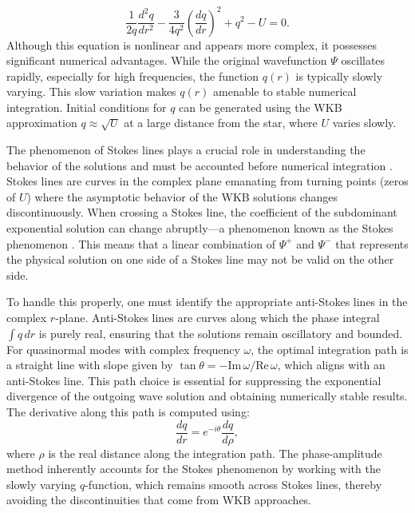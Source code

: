 \begin{equation}
	\frac{1}{2q} \frac{d^2 q}{dr^2} - \frac{3}{4q^2} \left( \frac{dq}{dr} \right)^2 + q^2 - U = 0.
\end{equation}
Although this equation is nonlinear and appears more complex, it possesses significant numerical advantages. While the original wavefunction \(\Psi\) oscillates rapidly, especially for high frequencies, the function \(q(r)\) is typically slowly varying. This slow variation makes \(q(r)\) amenable to stable numerical integration. Initial conditions for \(q\) can be generated using the WKB approximation \(q \approx \sqrt{U}\) at a large distance from the star, where \(U\) varies slowly.

The phenomenon of Stokes lines plays a crucial role in understanding the behavior of the solutions and must be accounted before numerical integration \cite{Anderson_inverse_cowling}. Stokes lines are curves in the complex plane emanating from turning points (zeros of \(U\)) where the asymptotic behavior of the WKB solutions changes discontinuously. When crossing a Stokes line, the coefficient of the subdominant exponential solution can change abruptly—a phenomenon known as the Stokes phenomenon \cite{Anderson_inverse_cowling}. This means that a linear combination of \(\Psi^+\) and \(\Psi^-\) that represents the physical solution on one side of a Stokes line may not be valid on the other side. 

To handle this properly, one must identify the appropriate anti-Stokes lines in the complex \(r\)-plane. Anti-Stokes lines are curves along which the phase integral \(\int q \, dr\) is purely real, ensuring that the solutions remain oscillatory and bounded. For quasinormal modes with complex frequency \(\omega\), the optimal integration path is a straight line with slope given by \(\tan \theta = -\text{Im} \, \omega / \text{Re} \, \omega\), which aligns with an anti-Stokes line. This path choice is essential for suppressing the exponential divergence of the outgoing wave solution and obtaining numerically stable results. The derivative along this path is computed using:
\begin{equation}
	\frac{dq}{dr} = e^{-i\theta} \frac{dq}{d\rho},
\end{equation}
where \(\rho\) is the real distance along the integration path. The phase-amplitude method inherently accounts for the Stokes phenomenon by working with the slowly varying \(q\)-function, which remains smooth across Stokes lines, thereby avoiding the discontinuities that come from WKB approaches.

